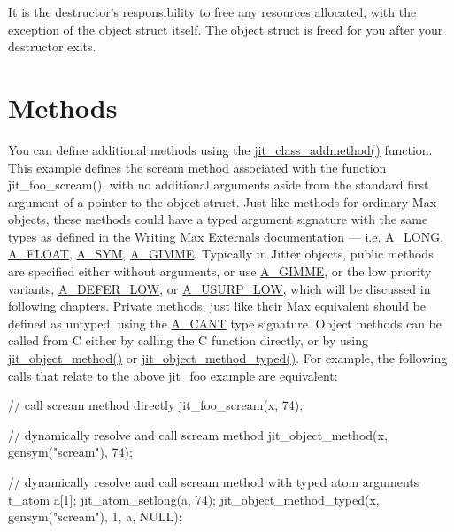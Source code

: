 It is the destructor's responsibility to free any resources allocated, with the exception of the object struct itself. The object struct is freed for you after your destructor exits.\hypertarget{chapter_jit_objectmodel_chapter_jit_objectmodel_methods}{}\section{Methods}\label{chapter_jit_objectmodel_chapter_jit_objectmodel_methods}
You can define additional methods using the \hyperlink{group__classmod_gab3b84bc08f9f3ee0b29010f653c5ea77}{jit\_\-class\_\-addmethod()} function. This example defines the scream method associated with the function jit\_\-foo\_\-scream(), with no additional arguments aside from the standard first argument of a pointer to the object struct. Just like methods for ordinary Max objects, these methods could have a typed argument signature with the same types as defined in the Writing Max Externals documentation — i.e. \hyperlink{group__atom_gga8aa6700e9f00b132eb376db6e39ade47a002f28879581a6f66ea492b994b96f1e}{A\_\-LONG}, \hyperlink{group__atom_gga8aa6700e9f00b132eb376db6e39ade47a0b3aa0ab8104573dfc9cb70b5b08031f}{A\_\-FLOAT}, \hyperlink{group__atom_gga8aa6700e9f00b132eb376db6e39ade47a2d661c2a5d949566e2f1944c99bceeea}{A\_\-SYM}, \hyperlink{group__atom_gga8aa6700e9f00b132eb376db6e39ade47a81c1a8550f038db16a619167a70a79b6}{A\_\-GIMME}. Typically in Jitter objects, public methods are specified either without arguments, or use \hyperlink{group__atom_gga8aa6700e9f00b132eb376db6e39ade47a81c1a8550f038db16a619167a70a79b6}{A\_\-GIMME}, or the low priority variants, \hyperlink{group__atom_gga8aa6700e9f00b132eb376db6e39ade47a4556bc5fe0d4f8cc55eda5aeeee55cf2}{A\_\-DEFER\_\-LOW}, or \hyperlink{group__atom_gga8aa6700e9f00b132eb376db6e39ade47a8c844b0a1b551341a6a5e3b95d2f1152}{A\_\-USURP\_\-LOW}, which will be discussed in following chapters. Private methods, just like their Max equivalent should be defined as untyped, using the \hyperlink{group__atom_gga8aa6700e9f00b132eb376db6e39ade47af48193ec36e53b1507d81c49873c8d7a}{A\_\-CANT} type signature. Object methods can be called from C either by calling the C function directly, or by using \hyperlink{group__objectmod_ga9e1b9b8ed4fce611de26a74c6e1452c8}{jit\_\-object\_\-method()} or \hyperlink{group__objectmod_ga9c9b8591a887cddd19b313c8e995fbea}{jit\_\-object\_\-method\_\-typed()}. For example, the following calls that relate to the above jit\_\-foo example are equivalent:


\begin{DoxyCode}
// call scream method directly
jit_foo_scream(x, 74); 

// dynamically resolve and call scream method 
jit_object_method(x, gensym("scream"), 74); 

// dynamically resolve and call scream method with typed atom arguments 
t_atom a[1];
jit_atom_setlong(a, 74);
jit_object_method_typed(x, gensym("scream"), 1, a, NULL);
\end{DoxyCode}


